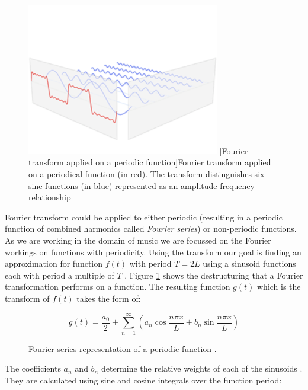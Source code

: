 \begin{figure}[H]
    \centering
    \includegraphics[width=0.75\textwidth]{BackgroundTheory/fourier-series.png}
    [Fourier transform applied on a periodic function]{Fourier transform applied on a periodical function (in red). The transform distinguishes six sine functions (in blue) represented as an amplitude-frequency relationship \cite{fourierseries}}
    \label{fig:fourierseriesimage}
\end{figure}

Fourier transform could be applied to either periodic (resulting in a periodic
function of combined harmonics called \textit{Fourier series}) or non-periodic
functions. As we are working in the domain of music we are focussed on the
Fourier workings on functions with periodicity. Using the transform our goal is
finding an approximation for function $f(t)$ with period $T=2L$ using a sinusoid
functions each with period a multiple of $T$ \cite{fourierseries}. Figure
\ref{fig:fourierseriesimage} shows the destructuring that a Fourier
transformation performs on a function. The resulting function $g(t)$ which is
the transform of $f(t)$ takes the form of:

\begin{figure}[H]
    \label{fig:fourierseriesequation}
    \begin{equation}
        g(t) = \frac{a_0}{2} + \sum_{n=1}^{\infty}({a_n}\cos\frac{n{\pi}x}{L} + {b_n}\sin\frac{n{\pi}x}{L})
    \end{equation}
    \caption[Fourier transformation equation for periodic functions]{Fourier series representation of a periodic function \cite{fourierequations}.}
\end{figure}

The coefficients $a_n$ and $b_n$ determine the relative weights of each of the
sinusoids \cite{fourierseries}. They are calculated using sine and cosine
integrals over the function period:

